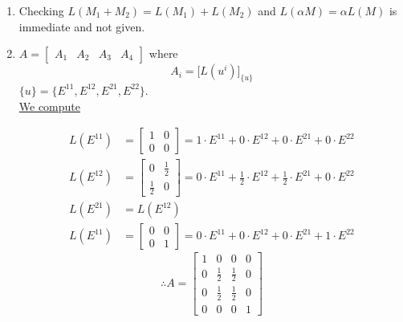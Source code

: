 \documentclass[letterpaper]{article}
\begin{document}
\begin{enumerate}
\setlength{\itemsep}{.1in}
\renewcommand{\labelenumi}{(\alph{enumi})}

\item Checking $L(M_1+M_2) = L(M_1) + L(M_2)$ and $L(\alpha M) = \alpha L(M)$ is immediate and not given.

\item $A=\left[\begin{array}{c|c|c|c} A_1 & A_2 & A_3 & A_4\end{array}\right]$ where
$$A_i=\big[L(u^i)\big]_{\{u\}}$$
$\{u\}=\{E^{11},E^{12},E^{21},E^{22}\}$. \medskip \\
\underline{We compute}

\setlength{\jot}{8pt}
\begin{align*}
L(E^{11})&=\left[\begin{array}{cc} 1 & 0 \\ 0 &0\end{array}\right]=1 \cdot E^{11}+0 \cdot E^{12}+0 \cdot E^{21}+0 \cdot E^{22} \\
L(E^{12})&=\left[\begin{array}{cc} 0 & \frac{1}{2} \\ \frac{1}{2} & 0\end{array}\right]=0 \cdot E^{11}+\frac{1}{2} \cdot E^{12}+\frac{1}{2} \cdot E^{21}+0 \cdot E^{22} \\
L(E^{21})&= L(E^{12}) \\
L(E^{11})&=\left[\begin{array}{cc} 0 & 0 \\ 0 &1\end{array}\right]=0 \cdot E^{11}+0 \cdot E^{12}+0 \cdot E^{21}+1 \cdot E^{22}
\end{align*}
\renewcommand{\arraystretch}{1.25}
$$\therefore A=\left[\begin{array}{cccc} 1&0&0&0 \\0&\frac{1}{2}&\frac{1}{2}&0 \\ 0&\frac{1}{2}&\frac{1}{2}&0 \\ 0&0&0&1\end{array}\right]$$

\end{enumerate}

\newpage
\end{document}
